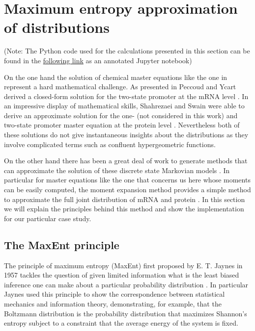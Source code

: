 \section{Maximum entropy approximation of distributions}\label{supp_maxent}

(Note: The Python code used for the calculations presented in this section can
be found in the
\href{https://www.rpgroup.caltech.edu//chann_cap/software/MaxEnt_approx_joint.html}{following
link} as an annotated Jupyter notebook)

On the one hand the solution of chemical master equations like the one in
 represent a hard mathematical challenge. As presented in
 Peccoud and Ycart derived a closed-form solution
for the two-state promoter at the mRNA level \cite{Peccoud1995}. In an
impressive display of mathematical skills, Shahrezaei and Swain were able to
derive an approximate solution for the one- (not considered in this work) and
two-state promoter master equation at the protein level \cite{Shahrezaei2008}.
Nevertheless both of these solutions do not give instantaneous insights about
the distributions as they involve complicated terms such as confluent
hypergeometric functions.

On the other hand there has been a great deal of work to generate methods that
can approximate the solution of these discrete state Markovian models
\cite{Ale2013, Andreychenko2017, Frohlich2016, Schnoerr2017, Smadbeck2013}. In
particular for master equations like the one that concerns us here whose
moments can be easily computed, the moment expansion method provides a simple
method to approximate the full joint distribution of mRNA and protein
\cite{Smadbeck2013}. In this section we will explain the principles behind this
method and show the implementation for our particular case study.

\subsection{The MaxEnt principle}

The principle of maximum entropy (MaxEnt) first proposed by E. T. Jaynes in
1957 tackles the question of given limited information what is the least biased
inference one can make about a particular probability distribution
\cite{Jaynes1957}. In particular Jaynes used this principle to show the
correspondence between statistical mechanics and information theory,
demonstrating, for example, that the Boltzmann distribution is the probability
distribution that maximizes Shannon's entropy subject to a constraint that the
average energy of the system is fixed.

